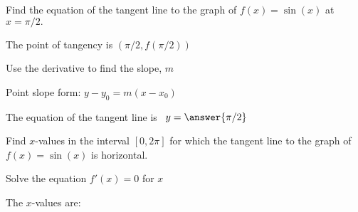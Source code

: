 \documentclass{ximera}
\begin{document}
\begin{problem} %

Find the equation of the tangent line to the graph of $f(x) = \sin(x)$ at $x=\pi/2.$

\begin{hint}
The point of tangency is $(\pi/2, f(\pi/2))$
\end{hint}
\begin{hint}
Use the derivative to find the slope, $m$
\end{hint}
\begin{hint}
Point slope form: $y-y_0 = m(x-x_0)$
\end{hint}

The equation of the tangent line is \ $y = \answer{\pi/2}$

\end{problem}



\begin{problem} %

Find $x$-values in the interval $[0, 2\pi]$ for which the tangent line to the graph of $f(x) = \sin(x)$ is horizontal.


\begin{hint}
Solve the equation $f'(x) = 0$ for $x$
\end{hint}

The $x$-values are:
\begin{multipleChoice}
\end{multipleChoice}

\end{problem}






\end{document}
